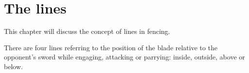 \chapter{The lines}\label{ch:lines}

This chapter will discuss the concept of lines in fencing.

There are four lines referring to the position of the blade relative to the opponent's sword while engaging, attacking or parrying: inside, outside, above or below.
